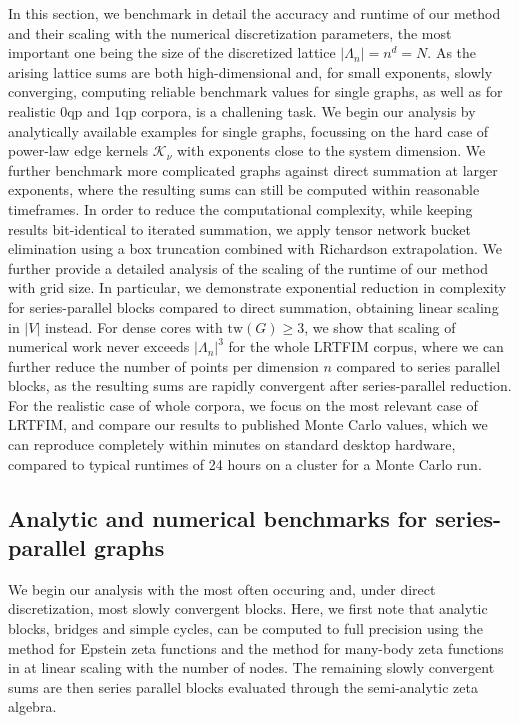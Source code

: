 \documentclass[]{amsart}
\numberwithin{mythm}{section}
\begin{document}
In this section, we benchmark in detail the accuracy and runtime of our method and their scaling with the numerical discretization parameters, the most important one being the size of the discretized lattice $|\Lambda_n|=n^d=N$. As the arising lattice sums are both high-dimensional and, for small exponents, slowly converging, computing reliable benchmark values for single graphs, as well as for realistic 0qp and 1qp corpora, is a challening task. We begin our analysis by analytically available examples for single graphs, focussing on the hard case of power-law edge kernels $\mathcal K_\nu$ with exponents close to the system dimension. We further benchmark more complicated graphs against direct summation at larger exponents, where the resulting sums can still be computed within reasonable timeframes. In order to reduce the computational complexity, while keeping results bit-identical to iterated summation, we apply tensor network bucket elimination using a box truncation combined with Richardson extrapolation. We further provide a detailed analysis of the scaling of the runtime of our method with grid size. In particular, we demonstrate exponential reduction in complexity for series-parallel blocks compared to direct summation, obtaining linear scaling in $|V|$ instead. For dense cores with $\mathrm{tw}(G)\ge 3$, we show that scaling of numerical work never exceeds $|\Lambda_n|^3$ for the whole LRTFIM corpus, where we can further reduce the number of points per dimension $n$ compared to series parallel blocks, as the resulting sums are rapidly convergent after series-parallel reduction. For the realistic case of whole corpora, we focus on the most relevant case of LRTFIM, and compare our results to published Monte Carlo values, which we can reproduce completely within minutes on standard desktop hardware, compared to typical runtimes of 24 hours on a cluster for a Monte Carlo run. 

\subsection{Analytic and numerical benchmarks for series-parallel graphs}

We begin our analysis with the most often occuring and, under direct discretization, most slowly convergent blocks. Here, we first note that analytic blocks, bridges and simple cycles, can be computed to full precision using the method for Epstein zeta functions \cite{buchheit2024epstein} and the method for many-body zeta functions in \cite{buchheit2025epstein_method} at linear scaling with the number of nodes. The remaining slowly convergent sums are then series parallel blocks evaluated through the semi-analytic zeta algebra.
\end{document}

